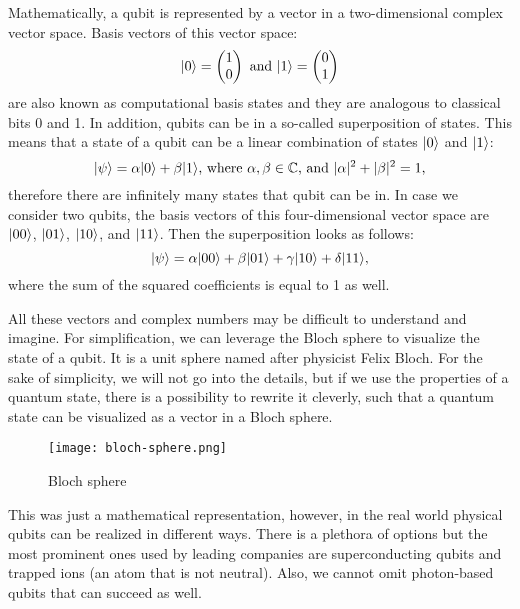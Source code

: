 Mathematically, a qubit is represented by a vector in a two-dimensional complex vector space. Basis vectors of this vector space:
\begin{equation*}
\lvert0\rangle = \begin{pmatrix} 1 \\ 0 \end{pmatrix}\text{ and }\lvert1\rangle = \begin{pmatrix} 0 \\ 1 \end{pmatrix}
\end{equation*}
are also known as computational basis states and they are analogous to classical bits 0 and 1. In addition, qubits can be in a so-called superposition of states. This means that a state of a qubit can be a linear combination of states $\lvert0\rangle$ and $\lvert1\rangle$:
\begin{equation*}
\lvert\psi\rangle = \alpha \lvert0\rangle + \beta \lvert1\rangle\text{, where } \alpha,\beta \in \mathbb{C}\text{, and } \lvert \alpha \rvert^2 + \lvert \beta \rvert^2 = 1\text{,}
\end{equation*}
therefore there are infinitely many states that qubit can be in. In case we consider two qubits, the basis vectors of this four-dimensional vector space are $\lvert00\rangle$, $\lvert01\rangle$, $\lvert10\rangle$, and $\lvert11\rangle$. Then the superposition looks as follows:
\begin{equation*}
 \lvert\psi\rangle = \alpha \lvert00\rangle + \beta \lvert01\rangle + \gamma \lvert10\rangle + \delta \lvert11\rangle\text{,}
\end{equation*}
where the sum of the squared coefficients is equal to 1 as well. 

All these vectors and complex numbers may be difficult to understand and imagine. For simplification, we can leverage the Bloch sphere to visualize the state of a qubit. It is a unit sphere named after physicist Felix Bloch. For the sake of simplicity, we will not go into the details, but if we use the properties of a quantum state, there is a possibility to rewrite it cleverly, such that a quantum state can be visualized as a vector in a Bloch sphere.

\begin{figure}[H]
    \begin{center}
       \texttt{[image: bloch-sphere.png]}
       \caption{Bloch sphere \cite{bloch_sphere}}
    \end{center}
\end{figure} 

This was just a mathematical representation, however, in the real world physical qubits can be realized in different ways. There is a plethora of options but the most prominent ones used by leading companies are superconducting qubits and trapped ions (an atom that is not neutral). Also, we cannot omit photon-based qubits that can succeed as well.  

